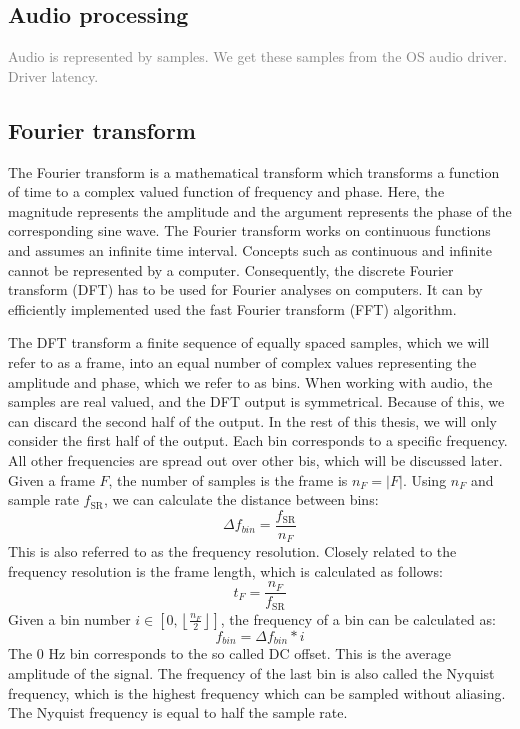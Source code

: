 \documentclass[10pt,twocolumn]{article}
\newcommand{\floor}[1]{\left \lfloor #1 \right \rfloor}
\begin{document}
\subsection{Audio processing}
\textcolor{gray}{Audio is represented by samples. We get these samples from the OS audio driver. Driver latency.}

\subsection{Fourier transform}
The Fourier transform is a mathematical transform which transforms a function of time to a complex valued function of frequency and phase. Here, the magnitude represents the amplitude and the argument represents the phase of the corresponding sine wave. The Fourier transform works on continuous functions and assumes an infinite time interval. Concepts such as continuous and infinite cannot be represented by a computer. Consequently, the discrete Fourier transform (DFT) has to be used for Fourier analyses on computers. It can by efficiently implemented used the fast Fourier transform (FFT) algorithm.

The DFT transform a finite sequence of equally spaced samples, which we will refer to as a frame, into an equal number of complex values representing the amplitude and phase, which we refer to as bins. When working with audio, the samples are real valued, and the DFT output is symmetrical. Because of this, we can discard the second half of the output. In the rest of this thesis, we will only consider the first half of the output. Each bin corresponds to a specific frequency. All other frequencies are spread out over other bis, which will be discussed later. Given a frame $F$, the number of samples is the frame is $n_F = |F|$. Using $n_F$ and sample rate $f_{\text{SR}}$, we can calculate the distance between bins:
\[ \Delta f_{bin} = \frac{f_{\text{SR}}}{n_F} \]
This is also referred to as the frequency resolution. Closely related to the frequency resolution is the frame length, which is calculated as follows:
\[ t_F = \frac{n_F}{f_{\text{SR}}} \]
Given a bin number $i \in [0, \floor{\frac{n_F}{2}}]$, the frequency of a bin can be calculated as:
\[ f_{bin} = \Delta f_{bin} * i \]
The 0 Hz bin corresponds to the so called DC offset. This is the average amplitude of the signal. The frequency of the last bin is also called the Nyquist frequency, which is the highest frequency which can be sampled without aliasing. The Nyquist frequency is equal to half the sample rate.
\end{document}
